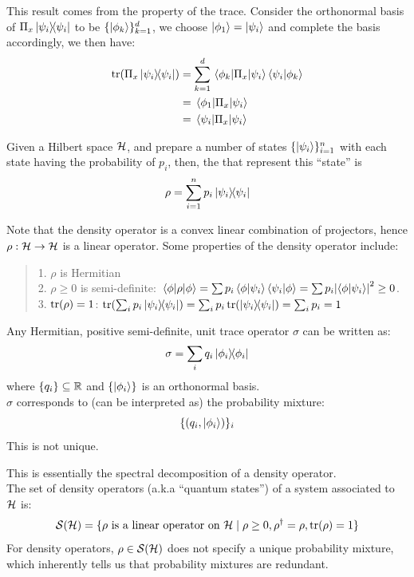 This result comes from the property of the trace. Consider the orthonormal basis of $\Pi_x \dyad{\psi_i}$ to be $\{\ket{\phi_k}\}_{k=1}^d$, we choose $\ket{\phi_1} = \ket{\psi_i}$ and complete the basis accordingly, we then have:
\begin{align*}
    \tr(\Pi_x \dyad{\psi_i}) &= \Sum{k=1}{d} \mel{\phi_k}{\Pi_x}{\psi_i}\braket{\psi_i}{\phi_k} \\
    &= \mel{\phi_1}{\Pi_x}{\psi_i} \\
    &= \ev{\Pi_x}{\psi_i}
\end{align*}
\begin{definition}
    Given a Hilbert space $\mathcal{H}$, and prepare a number of states $\{\ket{\psi_i}\}_{i=1}^n$ with each state having the probability of $p_i$, then, the  that represent this ``state'' is
    $$\rho = \Sum{i=1}{n} p_i \dyad{\psi_i}$$
\end{definition}
Note that the density operator is a convex linear combination of projectors, hence $\rho: \mathcal{H} \to \mathcal{H}$ is a linear operator. Some properties of the density operator include:
\begin{quote}
    1. $\rho$ is Hermitian \\
    2. $\rho \ge 0$ is semi-definite: $\ev{\rho}{\phi} = \sum p_i \braket{\phi}{\psi_i}\braket{\psi_i}{\phi} = \sum p_i \abs{\braket{\phi}{\psi_i}}^2 \ge 0$. \\
    3. $\tr(\rho) = 1$: $\tr(\Sumi{i}p_i \dyad{\psi_i}) = \Sumi{i}p_i \tr(\dyad{\psi_i}) = \Sumi{i}p_i = 1 $
\end{quote}
\begin{theorem}
    Any Hermitian, positive semi-definite, unit trace operator $\sigma$ can be written as:
    $$\sigma = \Sumi{i} q_i \dyad{\phi_i}$$
    where $\{q_i\} \subseteq \mathbb{R}$ and $\{\ket{\phi_i}\}$ is an orthonormal basis. \\
    $\sigma$ corresponds to (can be interpreted as) the probability mixture:
    $$\{(q_i, \ket{\phi_i})\}_i$$
    This is not unique.
\end{theorem}
This is essentially the spectral decomposition of a density operator. \\
The set of density operators (a.k.a ``quantum states'') of a system associated to $\mathcal{H}$ is:
$$\mathcal{S}(\mathcal{H}) = \{\rho \text{ is a linear operator on }\mathcal{H} \mid \rho \ge 0, \rho^{\dagger} = \rho, \tr(\rho) = 1\}$$
For density operators, $\rho \in \mathcal{S}(\mathcal{H})$ does not specify a unique probability mixture, which inherently tells us that probability mixtures are redundant.
